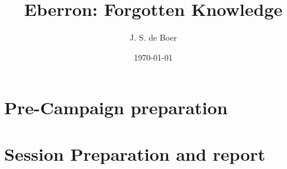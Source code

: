 \documentclass[11pt,a5paper,footinclude=true,headinclude=true,usenames,dvipsnames]{scrbook}
\title{Eberron: Forgotten Knowledge}
\author{J. S. de Boer}
\date{\today}
\let\cleardoublepage\clearpage
\begin{document}
  

\posttitle{\end{center}}
\maketitle 

\tableofcontents  
\cleardoublepage
\part{Pre-Campaign preparation} 

\part{Session Preparation and report}

\end{document}
